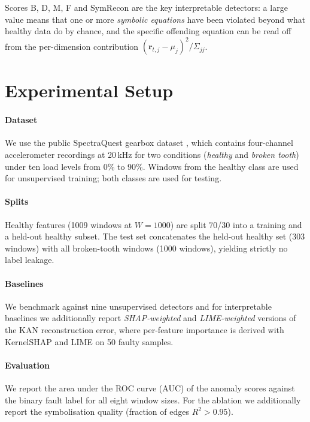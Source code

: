 \documentclass[conference]{IEEEtran}
\begin{document}
Scores B, D, M, F and SymRecon are the key interpretable detectors: a large
value means that one or more \emph{symbolic equations} have
been violated beyond what healthy data do by chance, and the
specific offending equation can be read off from the
per-dimension contribution $(\mathbf{r}_{t,j}-\mu_j)^2/\Sigma_{jj}$.

\section{Experimental Setup}
\label{sec:experiments}

\paragraph*{Dataset}
We use the public SpectraQuest gearbox dataset
\cite{spectraquest}, which contains four-channel
accelerometer recordings at 20\,kHz for two conditions
(\emph{healthy} and \emph{broken tooth}) under ten load
levels from 0\% to 90\%. Windows from the healthy class
are used for unsupervised training; both classes are used
for testing.

\paragraph*{Splits}
Healthy features (1009 windows at $W{=}1000$) are split
70/30 into a training and a held-out healthy subset. The
test set concatenates the held-out healthy set (303 windows)
with all broken-tooth windows (1000 windows), yielding
strictly no label leakage.

\paragraph*{Baselines}
We benchmark against nine unsupervised detectors and for interpretable baselines we
additionally report \emph{SHAP-weighted} and
\emph{LIME-weighted} versions of the KAN reconstruction
error, where per-feature importance is derived with
KernelSHAP and LIME on 50 faulty samples.

\paragraph*{Evaluation}
We report the area under the ROC curve (AUC) of the
anomaly scores against the binary fault label for all eight
window sizes. For the ablation we additionally report the
symbolisation quality (fraction of edges $R^2{>}0.95$).
\end{document}
